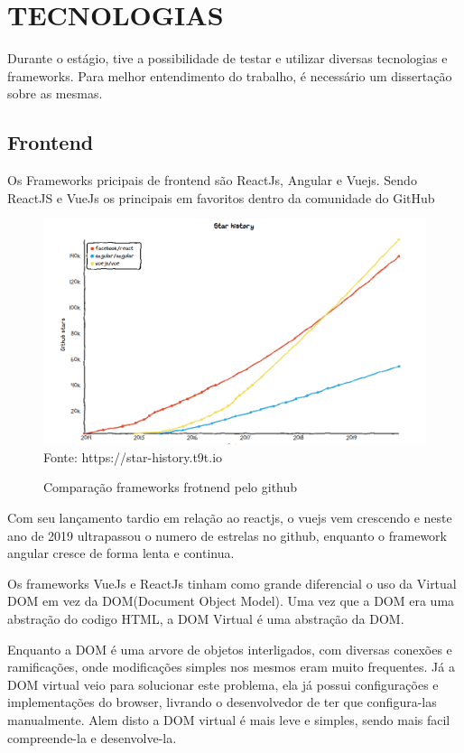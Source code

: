 \chapter{TECNOLOGIAS}
\label{cap:conclusao}

Durante o estágio, tive a possibilidade de testar e utilizar diversas tecnologias e frameworks.
Para melhor entendimento do trabalho, é necessário um dissertação sobre as mesmas.

\section{Frontend}

Os Frameworks pricipais de frontend são ReactJs, Angular e Vuejs.
Sendo ReactJS e VueJs os principais em favoritos dentro da comunidade do GitHub

\begin{figure}[H]
\centering
\caption{Comparação frameworks frotnend pelo github} %
\includegraphics[scale=0.35]{githubFramework}\\  %
\label{fig:exemplo} %
{\small Fonte: https://star-history.t9t.io} %
\end{figure}

Com seu lançamento tardio em relação ao reactjs, o vuejs vem crescendo e neste ano de 2019 ultrapassou o numero de estrelas no github, enquanto o framework angular
 cresce de forma lenta e continua.

Os frameworks VueJs e ReactJs tinham como grande diferencial o uso da Virtual DOM em vez da DOM(Document Object Model). Uma vez que a DOM era uma abstração do codigo HTML, a DOM Virtual é uma abstração da DOM.

Enquanto a DOM é uma arvore de objetos interligados, com diversas conexões e ramificações, onde modificações simples nos mesmos eram muito frequentes. Já a DOM virtual veio para 
solucionar este problema, ela já possui configurações e implementações do browser, livrando o desenvolvedor de ter que configura-las manualmente. Alem disto a DOM virtual é mais leve e simples, sendo mais facil compreende-la e desenvolve-la.

